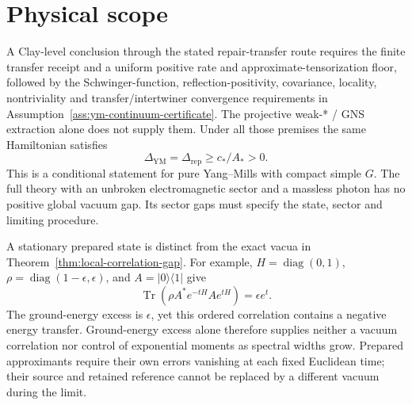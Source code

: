 \documentclass[11pt]{article}
\numberwithin{equation}{section}
\theoremstyle{remark}
\newcommand{\YM}{\mathrm{YM}}
\begin{document}
\section{Physical scope}

A Clay-level conclusion through the stated repair-transfer route requires
the finite transfer receipt and a uniform
positive rate and approximate-tensorization floor, followed by the
Schwinger-function, reflection-positivity, covariance, locality,
nontriviality and transfer/intertwiner convergence requirements in
Assumption~\ref{ass:ym-continuum-certificate}. The projective weak-* / GNS
extraction alone does not supply them. Under all those premises the same
Hamiltonian satisfies
\[
\Delta_{\YM}=\Delta_{\mathrm{rep}}\ge c_*/A_*>0.
\]
This is a conditional statement for pure Yang--Mills with compact simple
$G$. The full theory with an unbroken electromagnetic sector and a massless
photon has no positive global vacuum gap. Its sector gaps must specify
the state, sector and limiting procedure.

A stationary prepared state is distinct from the exact
vacua in Theorem~\ref{thm:local-correlation-gap}. For example,
\(H=\operatorname{diag}(0,1)\),
\(\rho=\operatorname{diag}(1-\epsilon,\epsilon)\), and
\(A=|0\rangle\langle1|\) give
\[
\operatorname{Tr}\!\left(\rho A^*e^{-tH}Ae^{tH}\right)
=\epsilon e^t.
\]
The ground-energy excess is \(\epsilon\), yet this ordered correlation
contains a negative energy transfer. Ground-energy excess alone therefore
supplies neither a vacuum correlation nor control of exponential moments
as spectral widths grow. Prepared approximants require their own errors
vanishing at each fixed Euclidean time; their source and retained
reference cannot be replaced by a different vacuum during the limit.
\end{document}
